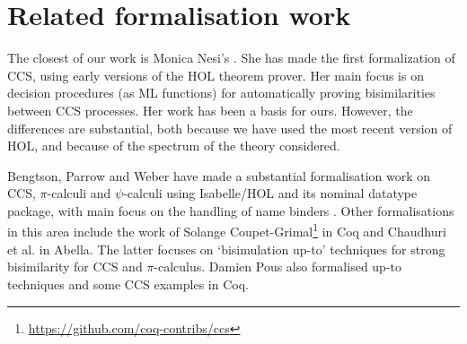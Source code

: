 \section{Related formalisation work}
\label{s:rel}

The closest of our work is Monica Nesi's \cite{Nesi:1992ve,Nesi:2017wo}. She has made
the first formalization of CCS,  using early versions of the HOL theorem prover.
Her main focus is  on
 decision procedures (as ML functions) for
automatically proving bisimilarities between CCS
processes.  Her work has been a basis for ours. However, the differences are substantial,
both because we have used the most recent version of HOL, and because of the spectrum of
the theory considered.

Bengtson,  Parrow and Weber
have made a substantial formalisation work 
on CCS, $\pi$-calculi
and $\psi$-calculi 
using Isabelle/HOL and its nominal datatype package, with main focus on the handling of
name binders \cite{bengtson2010formalising,bengtson2007completeness,bengtson2007formalising}.
%
Other formalisations in this area include the work of Solange
Coupet-Grimal\footnote{\url{https://github.com/coq-contribs/ccs}} in Coq
and Chaudhuri et al.\;\cite{chaudhuri2015lightweight} in Abella. The
latter focuses on `bisimulation up-to' techniques for strong bisimilarity 
for CCS and $\pi$-calculus.
Damien Pous also formalised up-to techniques and some CCS examples in
Coq. \cite{pous2007new}
